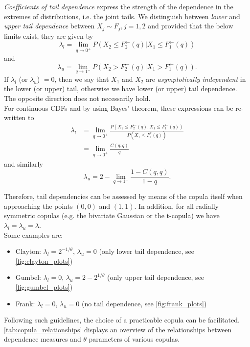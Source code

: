 
\textit{Coefficients of tail dependence} express the strength of the dependence in the extremes of distributions, i.e. the joint tails. We distinguish between \textit{lower} and \textit{upper tail dependence} between $X_j \sim F_j, j = 1,2$ and provided that the below limits exist, they are given by
\begin{equation}
\lambda_{l}=\lim \limits _ {q \rightarrow 0^+} P \left(X_{2} \leq F_{2}^{\leftarrow}(q) | X_{1} \leq F_{1}^{\leftarrow}(q)\right) 
\label{eq:lower_tail_dependence}
\end{equation}
and 
\begin{equation}
\lambda_{u}=\lim \limits _ {q \rightarrow 1^-} P \left(X_{2} > F_{2}^{\leftarrow}(q) | X_{1} > F_{1}^{\leftarrow}(q)\right).
\label{eq:upper_tail_dependence}
\end{equation}
If $\lambda_l$ (or $\lambda_u$) $=0$, then we say that $X_1$ and $X_2$ are \textit{asymptotically independent} in the lower (or upper) tail, otherwise we have lower (or upper) tail dependence. The opposite direction does not necessarily hold.\\
For continuous \acp{CDF} and by using Bayes' theorem, these expressions can be re-written to
\begin{equation}
\begin{aligned}
\lambda_{l} &=\lim _{q \rightarrow 0^+} \frac{P\left(X_{2} \leq F_{2}^{\leftarrow}(q), X_{1} \leq F_{1}^{\leftarrow}(q)\right)}{P\left(X_{1} \leq F_{1}^{*}(q)\right)} \\
&=\lim _{q \rightarrow 0^+} \frac{C(q, q)}{q}
\end{aligned}
\end{equation}
and similarly
\begin{equation}
\lambda_u = 2-\lim _{q \rightarrow 1^-} \frac{1-C(q, q)}{1-q}.
\end{equation}

Therefore, tail dependencies can be assessed by means of the copula itself when approaching the points $(0,0)$ and $(1,1)$. In addition, for all radially symmetric copulas (e.g. the bivariate Gaussian or the t-copula) we have $\lambda_l = \lambda_u = \lambda$.\\
Some examples are:
\begin{itemize}
\item Clayton: $\lambda_l = 2^{-1/ \theta}$, $\lambda_u = 0$ (only lower tail dependence, see \autoref{fig:clayton_plots})
\item Gumbel: $\lambda_l = 0$, $\lambda_u = 2 - 2^{1/ \theta}$ (only upper tail dependence, see \autoref{fig:gumbel_plots})
\item Frank: $\lambda_l = 0$, $\lambda_u = 0$ (no tail dependence, see \autoref{fig:frank_plots})
\end{itemize}
Following such guidelines, the choice of a practicable copula can be facilitated. \autoref{tab:copula_relationships} displays an overview of the relationships between dependence measures and $\theta$ parameters of various copulas.\\



